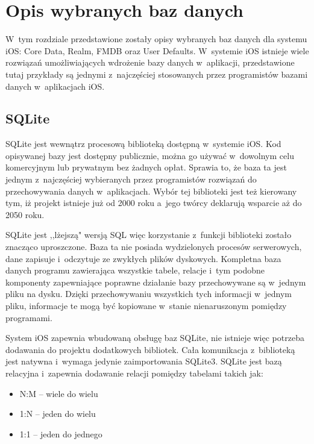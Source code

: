 \section{Opis wybranych baz danych}

 W~tym rozdziale przedstawione zostały opisy wybranych baz danych dla systemu iOS: Core Data, Realm, FMDB oraz User Defaults. W~systemie iOS istnieje wiele rozwiązań umożliwiających wdrożenie bazy danych w~aplikacji, przedstawione tutaj przykłady są jednymi z~najczęściej stosowanych przez programistów bazami danych w~aplikacjach iOS.

\subsection{SQLite}
SQLite jest wewnątrz procesową biblioteką dostępną w~systemie iOS. Kod opisywanej bazy jest dostępny publicznie, można go używać w~dowolnym celu komercyjnym lub prywatnym bez żadnych opłat. Sprawia to, że baza ta jest jednym z~najczęściej wybieranych przez programistów rozwiązań do przechowywania danych w~aplikacjach. Wybór tej biblioteki jest też kierowany tym, iż projekt istnieje już od 2000 roku a~jego twórcy deklarują wsparcie aż do 2050 roku\cite{SQLite-doc}.\par

SQLite jest ,,lżejszą" wersją SQL więc korzystanie z~funkcji biblioteki zostało znacząco uproszczone. Baza ta nie posiada wydzielonych procesów serwerowych, dane zapisuje i~odczytuje ze zwykłych plików dyskowych. Kompletna baza danych programu zawierająca wszystkie tabele, relacje i~tym podobne komponenty zapewniające poprawne działanie bazy przechowywane są w~jednym pliku na dysku. Dzięki przechowywaniu wszystkich tych informacji w~jednym pliku, informacje te mogą być kopiowane w~stanie nienaruszonym pomiędzy programami.\par

System iOS zapewnia wbudowaną obsługę baz SQLite, nie istnieje więc potrzeba dodawania do projektu dodatkowych bibliotek. Cała komunikacja z~biblioteką jest natywna i~wymaga jedynie zaimportowania SQLite3\cite{SQLite-doc}. 
SQLite jest bazą relacyjna i~zapewnia dodawanie relacji pomiędzy tabelami takich jak: 

\begin{itemize}
  \item N:M – wiele do wielu
  \item 1:N – jeden do wielu
  \item 1:1 – jeden do jednego 
\end{itemize}

